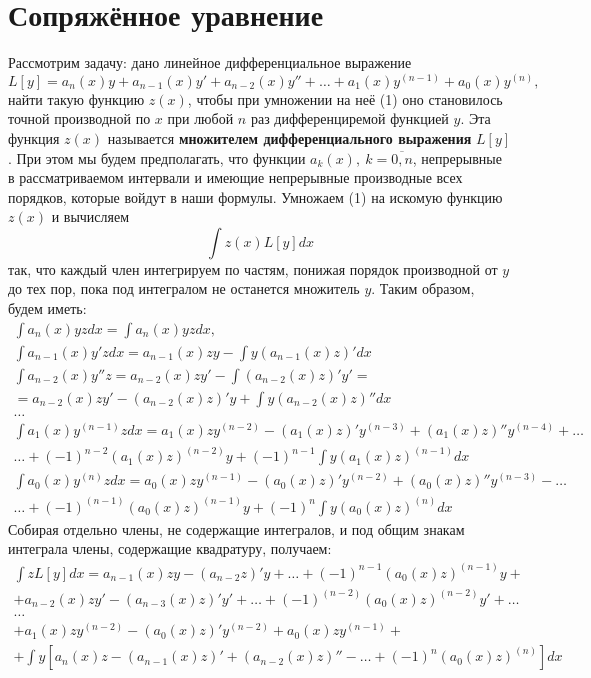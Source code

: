 \section{Сопряжённое уравнение}
Рассмотрим задачу: дано линейное дифференциальное выражение
\[
	L[y] = a_n (x) y + a_{n-1} (x) y' + a_{n-2} (x) y'' + \dots + a_1 (x) y^{(n-1)} + a_0 (x) y^{(n)}, \tag{1}
\]
найти такую функцию $z(x)$, чтобы при умножении на неё (1) оно становилось точной производной по $x$ при любой $n$ раз дифференциремой функцией $y$. Эта функция $z(x)$ называется \textbf{множителем дифференциального выражения} $L[y]$. При этом мы будем предполагать, что функции $a_k(x), ~ k = \overline{0,n}$, непрерывные в рассматриваемом интервали и имеющие непрерывные производные всех порядков, которые войдут в наши формулы. Умножаем (1) на искомую функцию $z(x)$ и вычисляем
\[
	\int z(x) L[y] dx
\]
так, что каждый член интегрируем по частям, понижая порядок производной от $y$ до тех пор, пока под интегралом не останется множитель $y$. Таким образом, будем иметь:
\[
	\begin{aligned}
		\int a_n (x) yzdx = \int a_n (x) yzdx, \\
		\int a_{n-1} (x) y'zdx = a_{n-1} (x) zy - \int y(a_{n-1} (x)z)'dx \\
		\int a_{n-2} (x) y''z = a_{n-2}(x) zy' - \int (a_{n-2} (x)z)' y' = \\
		= a_{n-2} (x) zy' - (a_{n-2} (x) z)'y + \int y(a_{n-2}(x)z)''dx \\
		\dots \\
		\int a_1 (x) y^{(n-1)}zdx = a_1 (x)zy^{(n-2)} - (a_1(x)z)'y^{(n-3)}+(a_1(x)z)''y^{(n-4)} + \dots \\
		\dots + (-1)^{n-2} (a_1(x)z)^{(n-2)}y + (-1)^{n-1} \int y(a_1(x)z)^{(n-1)}dx \\
		\int a_0(x) y^{(n)}zdx = a_0(x)zy^{(n-1)} - (a_0(x)z)'y^{(n-2)} + (a_0(x)z)''y^{(n-3)} - \dots \\
		\dots + (-1)^{(n-1)} (a_0(x)z)^{(n-1)}y + (-1)^n \int y(a_0(x)z)^{(n)}dx
	\end{aligned}
\]
Собирая отдельно члены, не содержащие интегралов, и под общим знакам интеграла члены, содержащие квадратуру, получаем:
\[
	\begin{aligned}
		\int zL[y]dx = a_{n-1} (x) zy - (a_{n-2}z)'y + \dots + (-1)^{n-1} (a_0(x)z)^{(n-1)}y + \\
		+ a_{n-2}(x)zy'-(a_{n-3}(x)z)'y' + \dots + (-1)^{(n-2)}(a_0(x)z)^{(n-2)}y' + \dots \\
		\dots \\
		+ a_1(x)zy^{(n-2)} - (a_0(x)z)'y^{(n-2)} + a_0(x) zy^{(n-1)} + \\
		+ \int y\left[ a_n(x)z - (a_{n-1}(x)z)' + (a_{n-2}(x)z)''- \dots + (-1)^n (a_0(x)z)^{(n)}\right]dx
	\end{aligned}
\]
